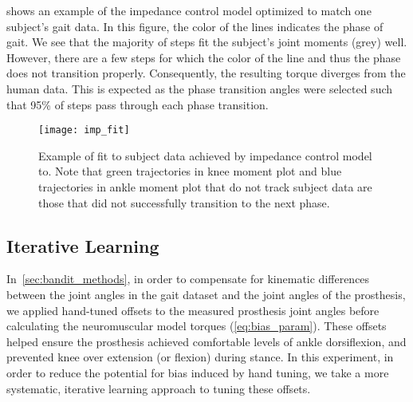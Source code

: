  shows an example of the impedance control model
optimized to match one subject's gait data. In this figure, the color of the
lines indicates the phase of gait. We see that the majority of steps fit the
subject's joint moments (grey) well. However, there are a few steps for which
the color of the line and thus the phase does not transition properly.
Consequently, the resulting torque diverges from the human data. This is
expected as the phase transition angles were selected such that 95\% of steps
pass through each phase transition.
\begin{figure}[t]
    \centering 
    \texttt{[image: imp\_fit]}
    \caption[Example of fit to subject data achieved by impedance control
    model]{Example of fit to subject data achieved by impedance control model
    to. Note that green trajectories in knee moment plot and blue trajectories
    in ankle moment plot that do not track subject data are those that did not
    successfully transition to the next phase.}\label{fig:treadmill_imp_fit}
\end{figure}

\subsection{Iterative Learning}\label{sec:treadmill_exp_iterative_learning}
In~\cref{sec:bandit_methods}, in order to compensate for kinematic differences
between the joint angles in the gait dataset and the joint angles of the
prosthesis, we applied hand-tuned offsets to the measured prosthesis joint
angles before calculating the neuromuscular model torques
(\cref{eq:bias_param}). These offsets helped ensure the prosthesis achieved
comfortable levels of ankle dorsiflexion, and prevented knee over extension (or
flexion) during stance. In this experiment, in order to reduce the potential for
bias induced by hand tuning, we take a more systematic, iterative learning
approach to tuning these offsets.

